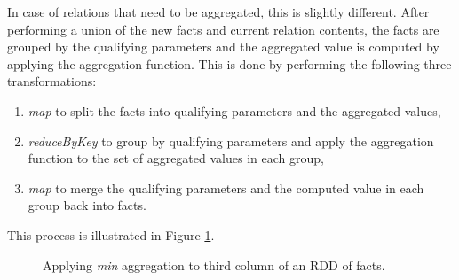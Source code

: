 In case of relations that need to be aggregated, this is slightly different. After performing a union of the new facts and current relation contents, the facts are grouped by the qualifying parameters and the aggregated value is computed by applying the aggregation function. This is done by performing the following three transformations:
\begin{enumerate}
\item \emph{map} to split the facts into qualifying parameters and the aggregated values,
\item \emph{reduceByKey} to group by qualifying parameters and apply the aggregation function to the set of aggregated values in each group,
\item \emph{map} to merge the qualifying parameters and the computed value in each group back into facts.
\end{enumerate}
This process is illustrated in Figure \ref{graphaggregate}.


\begin{figure}[!ht]
\centering
{}
\caption{Applying \emph{min} aggregation to third column of an RDD of facts.}\label{graphaggregate}
\end{figure}


